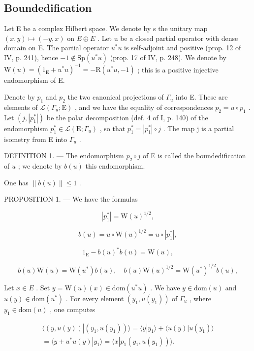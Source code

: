 \subsection{Boundedification}

Let E be a complex Hilbert space. We denote by s the unitary map \((x,y)\mapsto(-y,x)\) on \(E\oplus E\) . Let u be a closed partial operator with dense domain on E. The partial operator \(u^{*}u\) is self-adjoint and positive (prop. 12 of IV, p. 241), hence \(-1\notin\mathrm{Sp}(u^{*}u)\) (prop. 17 of IV, p. 248). We denote by \(\mathrm{W}(u)=(1_{\mathrm{E}}+u^{*}u)^{-1}=-\mathrm{R}(u^{*}u,-1)\) ; this is a positive injective endomorphism of E.

Denote by \(p_{1}\) and \(p_{2}\) the two canonical projections of \(\Gamma_{u}\) into E. These are elements of \(\mathcal{L}(\Gamma_{u};\mathrm{E})\) , and we have the equality of correspondences \(p_{2}=u\circ p_{1}\) . Let \((j,|p_{1}^{*}|)\) be the polar decomposition (def. 4 of I, p. 140) of the endomorphism \(p_{1}^{*}\in\mathcal{L}(\mathrm{E};\Gamma_{u})\) , so that \(p_{1}^{*}=|p_{1}^{*}|\circ j\) . The map j is a partial isometry from E into \(\Gamma_{u}\) .

DEFINITION 1. --- The endomorphism \(p_2 \circ j\) of E is called the boundedification of \(u\) ; we denote by \(b(u)\) this endomorphism.

One has \(\|b(u)\|\leqslant1\) .

PROPOSITION 1. --- We have the formulas

\[
| p _ {1} ^ {*} | = \mathrm{W} (u) ^ {1 / 2},\tag{1}
\]

\[
b (u) = u \circ \mathrm{W} (u) ^ {1 / 2} = u \circ | p _ {1} ^ {*} |,\tag{2}
\]

\[
1 _ {\mathrm{E}} - b (u) ^ {*} b (u) = \mathrm{W} (u),\tag{3}
\]

\[
b (u) \mathrm{W} (u) = \mathrm{W} (u ^ {*}) b (u), \quad b (u) \mathrm{W} (u) ^ {1 / 2} = \mathrm{W} (u ^ {*}) ^ {1 / 2} b (u),\tag{4}
\]

Let \(x \in E\) . Set \(y = \mathrm{W}(u)(x) \in \mathrm{dom}(u^{*}u)\) . We have \(y \in \mathrm{dom}(u)\) and \(u(y) \in \mathrm{dom}(u^{*})\) . For every element \((y_{1}, u(y_{1}))\) of \(\Gamma_{u}\) , where \(y_{1} \in \mathrm{dom}(u)\) , one computes

\[
\begin{array}{c} \langle (y, u (y)) | (y _ {1}, u (y _ {1})) \rangle = \langle y | y _ {1} \rangle + \langle u (y) | u (y _ {1}) \rangle \\ = \langle y + u ^ {*} u (y) | y _ {1} \rangle = \langle x | p _ {1} (y _ {1}, u (y _ {1})) \rangle . \end{array}
\]

